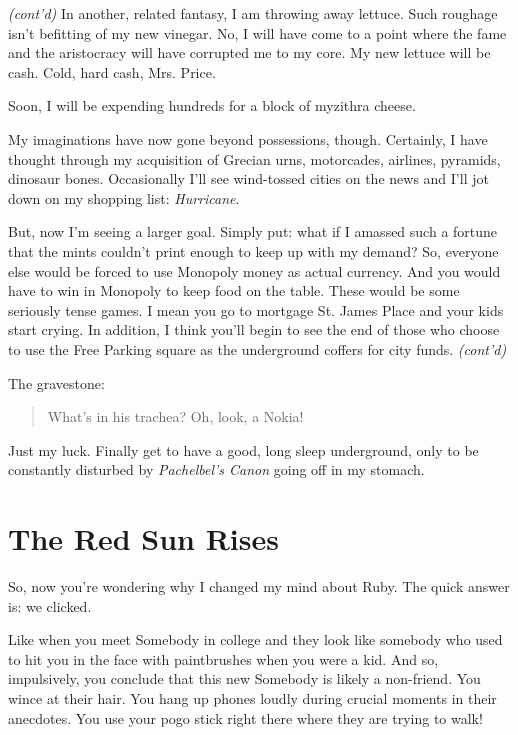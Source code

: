 \documentclass[10pt,twoside]{report}
\begin{document}
	\begin{sidebar}
	\textit{(cont'd)} In another, related fantasy, I am throwing away lettuce. Such roughage isn't befitting of my new vinegar. No, I will have come to a point where the fame and the aristocracy will have corrupted me to my core. My new lettuce will be cash. Cold, hard cash, Mrs. Price.\vspace{6pt}
	
	Soon, I will be expending hundreds for a block of myzithra cheese.\vspace{6pt}

	My imaginations have now gone beyond possessions, though. Certainly, I have thought through my acquisition of Grecian urns, motorcades, airlines, pyramids, dinosaur bones. Occasionally I'll see wind-tossed cities on the news and I'll jot down on my shopping list: \textit{Hurricane}.\vspace{6pt}

	But, now I'm seeing a larger goal. Simply put: what if I amassed such a fortune that the mints couldn't print enough to keep up with my demand? So, everyone else would be forced to use Monopoly money as actual currency. And you would have to win in Monopoly to keep food on the table. These would be some seriously tense games. I mean you go to mortgage St. James Place and your kids start crying. In addition, I think you'll begin to see the end of those who choose to use the Free Parking square as the underground coffers for city funds. \textit{(cont'd)}
	\end{sidebar}

The gravestone:

\begin{quote}
What's in his trachea? Oh, look, a Nokia!
\end{quote}

Just my luck.  Finally get to have a good, long sleep underground,
only to be constantly disturbed by {\em Pachelbel's Canon} going off
in my stomach.


\section{The Red Sun Rises}


So, now you're wondering why I changed my mind about Ruby.  The quick
answer is: we clicked.

Like when you meet Somebody in college and they look like somebody who
used to hit you in the face with paintbrushes when you were a kid.
And so, impulsively, you conclude that this new Somebody is likely a
non-friend.  You wince at their hair.  You hang up phones loudly
during crucial moments in their anecdotes.  You use your pogo stick
right there where they are trying to walk!
\end{document}
